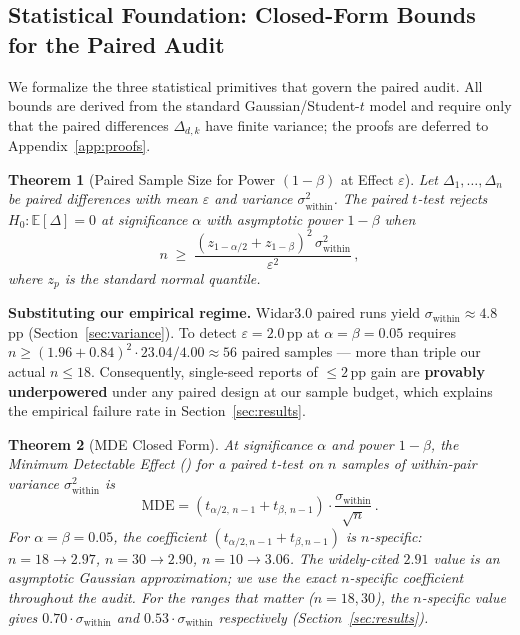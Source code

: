 \documentclass[11pt]{article}
\newtheorem{theorem}{Theorem}
\theoremstyle{definition}
\newcommand{\MDE}{\text{MDE}}
\begin{document}
\subsection{Statistical Foundation: Closed-Form Bounds for the Paired Audit}
\label{sec:statfoundation}

We formalize the three statistical primitives that govern the paired audit. All bounds are derived from the standard Gaussian/Student-$t$ model and require only that the paired differences $\Delta_{d,k}$ have finite variance; the proofs are deferred to Appendix~\ref{app:proofs}.

\begin{theorem}[Paired Sample Size for Power $(1-\beta)$ at Effect $\varepsilon$]
\label{thm:paired_n}
Let $\Delta_1, \ldots, \Delta_n$ be paired differences with mean $\varepsilon$ and variance $\sigma_\text{within}^2$. The paired $t$-test rejects $H_0: \mathbb{E}[\Delta] = 0$ at significance $\alpha$ with asymptotic power $1-\beta$ when
\begin{equation}
    n \;\ge\; \frac{(z_{1-\alpha/2} + z_{1-\beta})^2 \, \sigma_\text{within}^2}{\varepsilon^2}\,,
    \label{eq:paired_n}
\end{equation}
where $z_p$ is the standard normal quantile.
\end{theorem}

\noindent\textbf{Substituting our empirical regime.} Widar3.0 paired runs yield $\sigma_\text{within} \approx 4.8$\,pp (Section~\ref{sec:variance}). To detect $\varepsilon = 2.0$\,pp at $\alpha = \beta = 0.05$ requires $n \ge (1.96 + 0.84)^2 \cdot 23.04 / 4.00 \approx 56$ paired samples --- more than triple our actual $n \le 18$. Consequently, single-seed reports of $\le 2$\,pp gain are \textbf{provably underpowered} under any paired design at our sample budget, which explains the empirical failure rate in Section~\ref{sec:results}.

\begin{theorem}[MDE Closed Form]
\label{thm:mde_closed}
At significance $\alpha$ and power $1-\beta$, the Minimum Detectable Effect (\MDE{}) for a paired $t$-test on $n$ samples of within-pair variance $\sigma_\text{within}^2$ is
\begin{equation}
    \MDE{} = (t_{\alpha/2,\,n-1} + t_{\beta,\,n-1}) \cdot \frac{\sigma_\text{within}}{\sqrt{n}}\,.
    \label{eq:mde_closed_eq}
\end{equation}
For $\alpha = \beta = 0.05$, the coefficient $(t_{\alpha/2,n-1} + t_{\beta,n-1})$ is $n$-specific: $n = 18 \to 2.97$, $n = 30 \to 2.90$, $n = 10 \to 3.06$. The widely-cited $2.91$ value is an asymptotic Gaussian approximation; we use the exact $n$-specific coefficient throughout the audit. For the ranges that matter ($n = 18, 30$), the $n$-specific value gives $0.70 \cdot \sigma_\text{within}$ and $0.53 \cdot \sigma_\text{within}$ respectively (Section~\ref{sec:results}).
\end{theorem}
\end{document}
